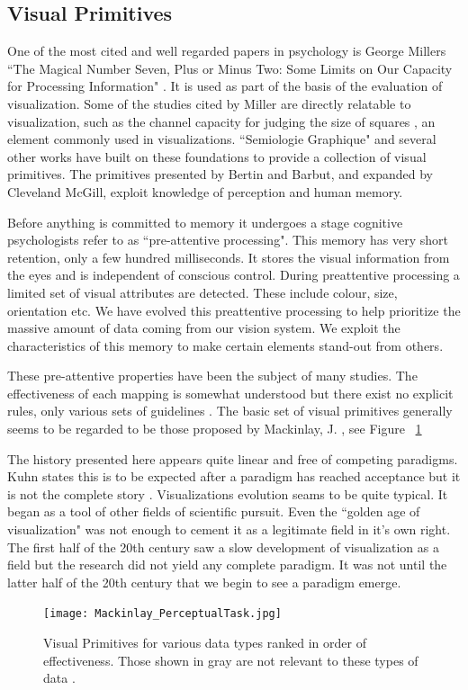 \documentclass[a4paper, 10pt, titlepage, twocolumn, onehalfspace]{article}
\begin{document}
\subsection{Visual Primitives}
One of the most cited and well regarded papers in psychology is George Millers ``The Magical Number Seven, Plus or Minus Two: Some Limits on Our Capacity for Processing Information" \cite{Mil56}. It is used as part of the basis of the evaluation of visualization. Some of the studies cited by Miller are directly relatable to visualization, such as the channel capacity for judging the size of squares \cite{eriksen1955absolute}, an element commonly used in visualizations. ``Semiologie Graphique" \cite{bertin1973semiologie} and several other works have built on these foundations to provide a collection of visual primitives. The primitives presented by Bertin and Barbut, and expanded by Cleveland McGill, exploit knowledge of perception and human memory. 

Before anything is committed to memory it undergoes a stage cognitive psychologists refer to as ``pre-attentive processing". This memory has very short retention, only a few hundred milliseconds. It stores the visual information from the eyes and is independent of conscious control. During preattentive processing a limited set of visual attributes are detected. These include colour, size, orientation etc. We have evolved this preattentive processing to help prioritize the massive amount of data coming from our vision system. We exploit the characteristics of this memory to make certain elements stand-out from others.

These pre-attentive properties have been the subject of many studies. The effectiveness of each mapping is somewhat understood but there exist no explicit rules, only various sets of guidelines \cite{few2004show}. The basic set of visual primitives generally seems to be regarded to be those proposed by Mackinlay, J. \cite{mackinlay1986automating}, see Figure ~\ref{fig:jock}

The history presented here appears quite linear and free of competing paradigms. Kuhn states this is to be expected after a paradigm has reached acceptance but it is not the complete story \cite{kuhn1996structure}. Visualizations evolution seams to be quite typical. It began as a tool of other fields of scientific pursuit. Even the ``golden age of visualization" was not enough to cement it as a legitimate field in it's own right. The first half of the 20th century saw a slow development of visualization as a field but the research did not yield any complete paradigm. It was not until the latter half of the 20th century that we begin to see a paradigm emerge. 
\begin{figure}[hbt]
  \begin{center}
    \texttt{[image: Mackinlay\_PerceptualTask.jpg]}
  \end{center}
  \caption{\small Visual Primitives for various data types ranked in order of effectiveness. Those shown in gray are not relevant to these types of data \cite{mackinlay1986automating}.}
  \label{fig:jock}
\end{figure}
\end{document}

